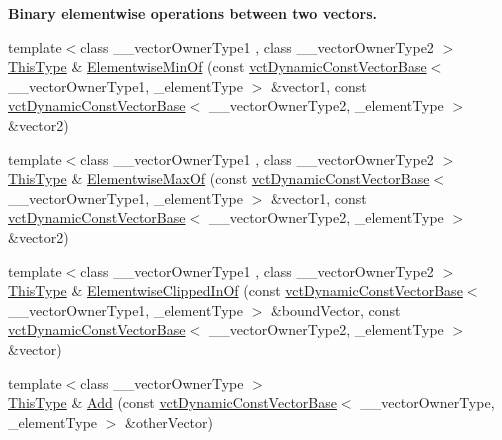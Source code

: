 \begin{Indent}{\bf Binary elementwise operations between two vectors.}
\begin{DoxyCompactItemize}
\item 
{\footnotesize template$<$class \+\_\+\+\_\+vector\+Owner\+Type1 , class \+\_\+\+\_\+vector\+Owner\+Type2 $>$ }\\\hyperlink{classvct_dynamic_const_vector_base_a39da273523717f678f54d3321ebca3dd}{This\+Type} \& \hyperlink{classvct_dynamic_vector_base_abedada58a344d1b9d9905c72d953d9e8}{Elementwise\+Min\+Of} (const \hyperlink{classvct_dynamic_const_vector_base}{vct\+Dynamic\+Const\+Vector\+Base}$<$ \+\_\+\+\_\+vector\+Owner\+Type1, \+\_\+element\+Type $>$ \&vector1, const \hyperlink{classvct_dynamic_const_vector_base}{vct\+Dynamic\+Const\+Vector\+Base}$<$ \+\_\+\+\_\+vector\+Owner\+Type2, \+\_\+element\+Type $>$ \&vector2)
\item 
{\footnotesize template$<$class \+\_\+\+\_\+vector\+Owner\+Type1 , class \+\_\+\+\_\+vector\+Owner\+Type2 $>$ }\\\hyperlink{classvct_dynamic_const_vector_base_a39da273523717f678f54d3321ebca3dd}{This\+Type} \& \hyperlink{classvct_dynamic_vector_base_ab3874cad21ff8758f4df3171a347e534}{Elementwise\+Max\+Of} (const \hyperlink{classvct_dynamic_const_vector_base}{vct\+Dynamic\+Const\+Vector\+Base}$<$ \+\_\+\+\_\+vector\+Owner\+Type1, \+\_\+element\+Type $>$ \&vector1, const \hyperlink{classvct_dynamic_const_vector_base}{vct\+Dynamic\+Const\+Vector\+Base}$<$ \+\_\+\+\_\+vector\+Owner\+Type2, \+\_\+element\+Type $>$ \&vector2)
\item 
{\footnotesize template$<$class \+\_\+\+\_\+vector\+Owner\+Type1 , class \+\_\+\+\_\+vector\+Owner\+Type2 $>$ }\\\hyperlink{classvct_dynamic_const_vector_base_a39da273523717f678f54d3321ebca3dd}{This\+Type} \& \hyperlink{classvct_dynamic_vector_base_a9a5e7b9273dd0a6bcd1634e87ce30cb0}{Elementwise\+Clipped\+In\+Of} (const \hyperlink{classvct_dynamic_const_vector_base}{vct\+Dynamic\+Const\+Vector\+Base}$<$ \+\_\+\+\_\+vector\+Owner\+Type1, \+\_\+element\+Type $>$ \&bound\+Vector, const \hyperlink{classvct_dynamic_const_vector_base}{vct\+Dynamic\+Const\+Vector\+Base}$<$ \+\_\+\+\_\+vector\+Owner\+Type2, \+\_\+element\+Type $>$ \&vector)
\item 
{\footnotesize template$<$class \+\_\+\+\_\+vector\+Owner\+Type $>$ }\\\hyperlink{classvct_dynamic_const_vector_base_a39da273523717f678f54d3321ebca3dd}{This\+Type} \& \hyperlink{classvct_dynamic_vector_base_a4eb825f90117f38bfebe2ba99521162e}{Add} (const \hyperlink{classvct_dynamic_const_vector_base}{vct\+Dynamic\+Const\+Vector\+Base}$<$ \+\_\+\+\_\+vector\+Owner\+Type, \+\_\+element\+Type $>$ \&other\+Vector)

\end{DoxyCompactItemize}
\end{Indent}
